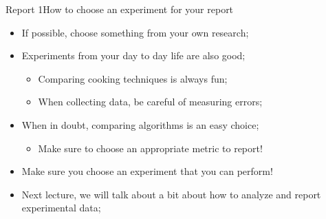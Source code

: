 \documentclass{beamer}
\begin{document}
\begin{CJK}{UTF8}{ipxm}
\begin{frame}{Report 1}{How to choose an experiment for your report}
  \begin{itemize}
    \item If possible, choose something from your own research;
    \medskip

    \item Experiments from your day to day life are also good;
    \begin{itemize}
      \item Comparing cooking techniques is always fun;
      \item When collecting data, be careful of measuring errors;
    \end{itemize}
    \medskip

    \item When in doubt, comparing algorithms is an easy choice;
    \begin{itemize}
      \item Make sure to choose an appropriate metric to report!
    \end{itemize}
    \medskip

    \item Make sure you choose an experiment that you can perform!
    \bigskip

    \item Next lecture, we will talk about a bit about how to analyze and report experimental data;
  \end{itemize}
\end{frame}




\end{CJK}
\end{document}

